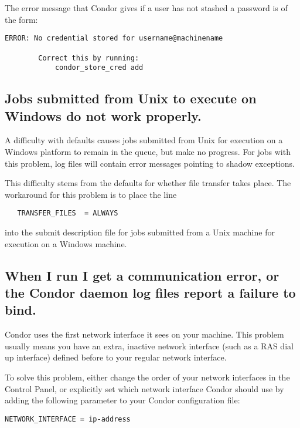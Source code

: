 The error message that Condor gives if a user has not stashed a
password is of the form:
\footnotesize
\begin{verbatim}
ERROR: No credential stored for username@machinename

        Correct this by running:
	        condor_store_cred add
\end{verbatim}
\normalsize

\subsection*{Jobs submitted from Unix to execute on Windows do not work properly.}

A difficulty with defaults causes jobs submitted from Unix for execution
on a Windows platform to remain in the queue, but make no progress.
For jobs with this problem, log files will contain error messages
pointing to shadow exceptions.

This difficulty stems from the defaults for whether file transfer
takes place.
The workaround for this problem is to place the line
\begin{verbatim}
   TRANSFER_FILES  = ALWAYS
\end{verbatim}
into the submit description file for jobs submitted from a Unix
machine for execution on a Windows machine.


\subsection*{When I run  I get a communication error, or the Condor daemon log files report a failure to bind.}

Condor uses the first network interface it sees on your machine.
This problem usually means you have an extra, inactive network
interface (such as a RAS dial up interface) defined before to your
regular network interface.

To solve this problem, either change the order of your network
interfaces in the Control Panel, or explicitly set which network
interface Condor should use by adding the following parameter to your
Condor configuration file:

\begin{verbatim}
NETWORK_INTERFACE = ip-address
\end{verbatim}

